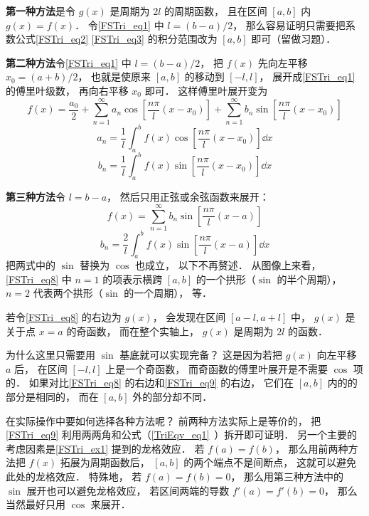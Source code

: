 \textbf{第一种方法}是令 $g(x)$ 是周期为 $2l$ 的周期函数， 且在区间 $[a, b]$ 内 $g(x) = f(x)$． 令\autoref{FSTri_eq1} 中 $l = (b-a)/2$， 那么容易证明只需要把系数公式\autoref{FSTri_eq2} \autoref{FSTri_eq3} 的积分范围改为 $[a,b]$ 即可（留做习题）．

\textbf{第二种方法}令\autoref{FSTri_eq1} 中 $l = (b-a)/2$， 把 $f(x)$ 先向左平移 $x_0 = (a+b)/2$， 也就是使原来 $[a,b]$ 的移动到 $[-l,l]$， 展开成\autoref{FSTri_eq1} 的傅里叶级数， 再向右平移 $x_0$ 即可． 这样傅里叶展开变为
\begin{equation}\label{FSTri_eq9}
f(x) = \frac{a_0}{2} + \sum_{n = 1}^\infty a_n \cos [\frac{n\pi}{l}(x-x_0)] + \sum_{n = 1}^\infty b_n \sin [\frac{n\pi}{l}(x-x_0)]
\end{equation}
\begin{equation}
a_n = \frac{1}{l} \int_{a}^b f(x)\cos [\frac{n\pi}{l}(x-x_0)] \dd{x} 
\end{equation}
\begin{equation}
b_n = \frac{1}{l} \int_{a}^b f(x)\sin [\frac{n\pi}{l}(x-x_0)] \dd{x}
\end{equation}

\textbf{第三种方法}令 $l = b - a$， 然后只用正弦或余弦函数来展开：
\begin{equation}\label{FSTri_eq8}
f(x) = \sum_{n = 1}^\infty b_n \sin [\frac{n\pi}{l}(x-a)]
\end{equation}
\begin{equation}
b_n = \frac{2}{l} \int_{a}^b f(x)\sin [\frac{n\pi}{l}(x-a)] \dd{x}
\end{equation}
把两式中的 $\sin$ 替换为 $\cos$ 也成立， 以下不再赘述． 从图像上来看， \autoref{FSTri_eq8} 中 $n=1$ 的项表示横跨 $[a,b]$ 的一个拱形（$\sin$ 的半个周期）， $n=2$ 代表两个拱形（$\sin$ 的一个周期）， 等．

若令\autoref{FSTri_eq8} 的右边为 $g(x)$， 会发现在区间 $[a-l, a+l]$ 中，  $g(x)$ 是关于点 $x = a$ 的奇函数， 而在整个实轴上， $g(x)$ 是周期为 $2l$ 的函数．

为什么这里只需要用 $\sin$ 基底就可以实现完备？ 这是因为若把 $g(x)$ 向左平移 $a$ 后， 在区间 $[-l, l]$ 上是一个奇函数， 而奇函数的傅里叶展开是不需要 $\cos$ 项的． 如果对比\autoref{FSTri_eq8} 的右边和\autoref{FSTri_eq9} 的右边， 它们在 $[a, b]$ 内的的部分是相同的， 而在 $[a, b]$ 外的部分却不同．

在实际操作中要如何选择各种方法呢？ 前两种方法实际上是等价的， 把\autoref{FSTri_eq9} 利用两两角和公式（\autoref{TriEqv_eq1}~）拆开即可证明． 另一个主要的考虑因素是\autoref{FSTri_ex1} 提到的龙格效应． 若 $f(a) = f(b)$， 那么用前两种方法把 $f(x)$ 拓展为周期函数后， $[a,b]$ 的两个端点不是间断点， 这就可以避免此处的龙格效应． 特殊地， 若 $f(a) = f(b) = 0$， 那么用第三种方法中的 $\sin$ 展开也可以避免龙格效应， 若区间两端的导数 $f'(a) = f'(b) = 0$， 那么当然最好只用 $\cos$ 来展开．

